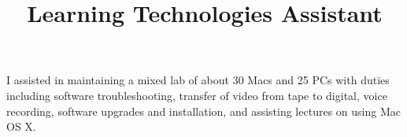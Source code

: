 \documentclass[margintitle,line]{res}
\renewcommand{\subsection}[1]{\section{\normalfont #1}}
\begin{document}
\begin{resume}
\title{Learning Technologies Assistant}
\begin{position}
 I assisted in maintaining a mixed lab of about 30 Macs and 25 PCs with duties including software troubleshooting, transfer of video from tape to digital, voice recording, software upgrades and installation, and assisting lectures on using Mac OS X.
\end{position}




%
%
%



\setlength{\parskip}{1ex}





\end{resume}
\end{document}
